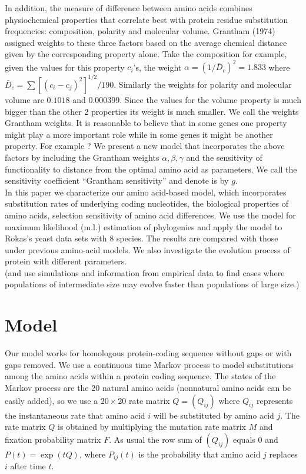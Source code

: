 \documentclass[13pt]{article}
\begin{document}
In addition, the measure of difference between amino acids combines physiochemical properties that correlate best with protein residue substitution frequencies: composition, polarity and molecular volume. Grantham (1974) assigned weights to these three factors based on the average chemical distance given by the corresponding property alone. Take the composition for example, given the values for this property $c_i$'s, the weight $\alpha = (1/\bar{D}_c)^2 = 1.833$ where $\bar{D}_c = \sum[(c_i - c_j)^2]^{1/2}/190$. Similarly the weights for polarity and molecular volume are $0.1018$ and $0.000399$. Since the values for the volume property is much bigger than the other 2 properties its weight is much smaller. We call the weights Grantham weights. It is reasonable to believe that in some genes one property might play a more important role while in some genes it might be another property. For example ?  We present a new model that incorporates the above factors by including the Grantham weights $\alpha, \beta, \gamma$ and the sensitivity of functionality to distance from the optimal amino acid as parameters. We call the sensitivity coefficient ``Grantham sensitivity'' and denote is by $g$.\\

In this paper we characterize our amino acid-based model, which incorporates substitution rates of underlying coding nucleotides, the biological properties of amino acids, selection sensitivity of amino acid differences. We use the model for maximum likelihood (m.l.) estimation of phylogenies and apply the model to Rokas's yeast data sets with 8 species. The results are compared with those under previous amino-acid models. We also investigate the evolution process of protein with different parameters.\\
(and use simulations and information from empirical data to find cases where populations of intermediate size may evolve faster than populations of large size.)

\section{Model}
Our model works for homologous protein-coding sequence without gaps or with gaps removed. We use a continuous time Markov process to model substitutions among the amino acids within a protein coding sequence. The states of the Markov process are the 20 natural amino acids (nonnatural amino acids can be easily added), so we use a $20 \times 20$ rate matrix $Q=(Q_{ij})$ where $Q_{ij}$ represents the instantaneous rate that amino acid $i$ will be substituted by amino acid $j$. The rate matrix $Q$ is obtained by multiplying the mutation rate matrix $M$ and fixation probability matrix $F$. As usual the row sum of $(Q_{ij})$ equals $0$ and $P(t) = \exp (tQ)$, where $P_{ij}(t)$ is the probability that amino acid $j$ replaces $i$ after time $t$.\\
\end{document}
